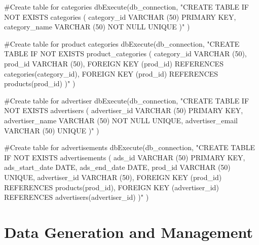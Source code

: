 \documentclass[
  letterpaper,
  DIV=11,
  numbers=noendperiod]{scrartcl}
\newenvironment{Shaded}{\begin{snugshade}}{\end{snugshade}}
\newcommand{\CommentTok}[1]{\textcolor[rgb]{0.37,0.37,0.37}{#1}}
\newcommand{\FunctionTok}[1]{\textcolor[rgb]{0.28,0.35,0.67}{#1}}
\newcommand{\NormalTok}[1]{\textcolor[rgb]{0.00,0.23,0.31}{#1}}
\newcommand{\StringTok}[1]{\textcolor[rgb]{0.13,0.47,0.30}{#1}}
\begin{document}
\begin{Shaded}
\begin{Highlighting}[numbers=left,,]
\CommentTok{\#Create table for categories}
\FunctionTok{dbExecute}\NormalTok{(db\_connection, }
          \StringTok{"CREATE TABLE IF NOT EXISTS categories (}
\StringTok{              category\_id VARCHAR (50) PRIMARY KEY,}
\StringTok{              category\_name VARCHAR (50) NOT NULL UNIQUE}
\StringTok{            )"}
\NormalTok{          )}

\CommentTok{\#Create table for product categories}
\FunctionTok{dbExecute}\NormalTok{(db\_connection, }
          \StringTok{"CREATE TABLE IF NOT EXISTS product\_categories (}
\StringTok{              category\_id VARCHAR (50),}
\StringTok{              prod\_id VARCHAR (50),}
\StringTok{              FOREIGN KEY (prod\_id)}
\StringTok{                REFERENCES categories(category\_id),}
\StringTok{              FOREIGN KEY (prod\_id)}
\StringTok{                REFERENCES products(prod\_id)}
\StringTok{            )"}
\NormalTok{          )}

\CommentTok{\#Create table for advertiser}
\FunctionTok{dbExecute}\NormalTok{(db\_connection, }
          \StringTok{"CREATE TABLE IF NOT EXISTS advertisers (}
\StringTok{              advertiser\_id VARCHAR (50) PRIMARY KEY,}
\StringTok{              advertiser\_name VARCHAR (50) NOT NULL UNIQUE,}
\StringTok{              advertiser\_email VARCHAR (50) UNIQUE}
\StringTok{            )"}
\NormalTok{          )}

\CommentTok{\#Create table for advertisements}
\FunctionTok{dbExecute}\NormalTok{(db\_connection, }
          \StringTok{"CREATE TABLE IF NOT EXISTS advertisements (}
\StringTok{              ads\_id VARCHAR (50) PRIMARY KEY,}
\StringTok{              ads\_start\_date DATE,}
\StringTok{              ads\_end\_date DATE,}
\StringTok{              prod\_id VARCHAR (50) UNIQUE,}
\StringTok{              advertiser\_id VARCHAR (50),}
\StringTok{              FOREIGN KEY (prod\_id)}
\StringTok{                REFERENCES products(prod\_id),}
\StringTok{              FOREIGN KEY (advertiser\_id)}
\StringTok{                REFERENCES advertisers(advertiser\_id)  }
\StringTok{            )"}
\NormalTok{          )}
\end{Highlighting}
\end{Shaded}

\hypertarget{data-generation-and-management}{%
\section{Data Generation and
Management}\label{data-generation-and-management}}
\end{document}
